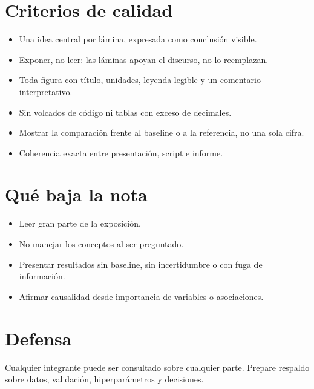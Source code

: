\documentclass[11pt,letterpaper]{article}
\begin{document}
\section*{Criterios de calidad}
\begin{itemize}
\item Una idea central por lámina, expresada como conclusión visible.
\item Exponer, no leer: las láminas apoyan el discurso, no lo reemplazan.
\item Toda figura con título, unidades, leyenda legible y un comentario interpretativo.
\item Sin volcados de código ni tablas con exceso de decimales.
\item Mostrar la comparación frente al baseline o a la referencia, no una sola cifra.
\item Coherencia exacta entre presentación, script e informe.
\end{itemize}
\section*{Qué baja la nota}
\begin{itemize}
\item Leer gran parte de la exposición.
\item No manejar los conceptos al ser preguntado.
\item Presentar resultados sin baseline, sin incertidumbre o con fuga de información.
\item Afirmar causalidad desde importancia de variables o asociaciones.
\end{itemize}
\section*{Defensa}
Cualquier integrante puede ser consultado sobre cualquier parte. Prepare respaldo sobre datos, validación, hiperparámetros y decisiones.
\end{document}
